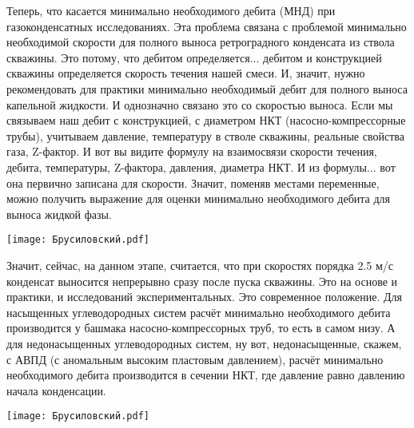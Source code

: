 \documentclass[main.tex]{subfiles}
\begin{document}
Теперь, что касается минимально необходимого дебита (МНД) при газоконденсатных исследованиях.
Эта проблема связана с проблемой минимально необходимой скорости для полного выноса ретроградного конденсата из ствола скважины.
Это потому, что дебитом определяется... дебитом и конструкцией скважины определяется скорость течения нашей смеси.
И, значит, нужно рекомендовать для практики минимально необходимый дебит для полного выноса капельной жидкости.
И однозначно связано это со скоростью выноса.
Если мы связываем наш дебит с конструкцией, с диаметром НКТ (насосно-компрессорные трубы), учитываем давление, температуру в стволе скважины, реальные свойства газа, Z-фактор.
И вот вы видите формулу на взаимосвязи скорости течения, дебита, температуры, Z-фактора, давления, диаметра НКТ.
И из формулы... вот она первично записана для скорости.
Значит, поменяв местами переменные, можно получить выражение для оценки минимально необходимого дебита для выноса жидкой фазы.

\begin{center}
\texttt{[image: Брусиловский.pdf]}
\end{center}

Значит, сейчас, на данном этапе, считается, что при скоростях порядка 2.5 м/с конденсат выносится непрерывно сразу после пуска скважины.
Это на основе и практики, и исследований экспериментальных.
Это современное положение.
Для насыщенных углеводородных систем расчёт минимально необходимого дебита производится у башмака насосно-компрессорных труб, то есть в самом низу.
А для недонасыщенных углеводородных систем, ну вот, недонасыщенные, скажем, с АВПД (с аномальным высоким пластовым давлением), расчёт минимально необходимого дебита производится в сечении НКТ, где давление равно давлению начала конденсации.

\begin{center}
\texttt{[image: Брусиловский.pdf]}
\end{center}
\end{document}
